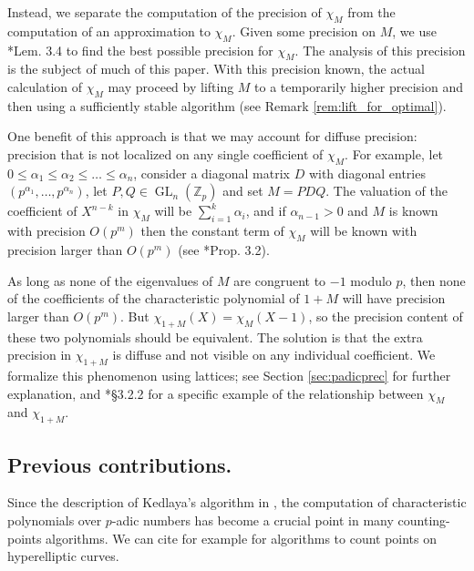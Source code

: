 \documentclass{sig-alternate-05-2015}
\DeclareMathOperator{\GL}{GL}
\newcommand{\Z}{\mathbb Z}
\newcommand{\Zp}{\Z_p}
\def\todo#1{\ \!\!{\color{red} #1}}
\begin{document}
Instead, we separate the computation of the precision of $\chi_M$ from the computation
of an approximation to $\chi_M$.  Given some precision on $M$, we use \cite{caruso-roe-vaccon:14a}*{Lem. 3.4}
to find the best possible precision for $\chi_M$.  The analysis of this precision is the subject
of much of this paper.  With this precision known, the actual calculation of $\chi_M$
may proceed by lifting $M$ to a temporarily higher precision and then using a sufficiently
stable algorithm (see Remark \ref{rem:lift_for_optimal}).

One benefit of this approach is that we may account for diffuse precision:
precision that is not localized on any single coefficient of $\chi_M$.  For example,
let $0 \le \alpha_1 \le \alpha_2 \le \dots \le \alpha_n$, consider a
diagonal matrix $D$ with diagonal entries $(p^{\alpha_1}, \dots, p^{\alpha_n})$,
let $P, Q \in \GL_n(\Zp)$ and set $M = PDQ$.  The valuation of the coefficient
of $X^{n-k}$ in $\chi_M$ will be $\sum_{i=1}^k \alpha_i$, and if $\alpha_{n-1} > 0$
and $M$ is known with precision $O(p^m)$ then the constant term of $\chi_M$
will be known with precision larger than $O(p^m)$ (see
\cite{caruso-roe-vaccon:15a}*{Prop. 3.2}).

As long as none of the eigenvalues of $M$ are congruent to $-1$ modulo $p$,
then none of the coefficients of the characteristic polynomial of $1+M$ will have
precision larger than $O(p^m)$.  But $\chi_{1+M}(X) = \chi_M(X-1)$, so the precision
content of these two polynomials should be equivalent. The solution is that the
extra precision in $\chi_{1+M}$ is diffuse and not visible on any individual coefficient.
We formalize this phenomenon using lattices; see Section \ref{sec:padicprec} for
further explanation, and \cite{caruso:17a}*{\S 3.2.2} for a specific example of the
relationship between $\chi_M$ and $\chi_{1+M}$.

\subsection*{Previous contributions.} 

Since the description of Kedlaya's algorithm in
\cite{kedlaya:01a}, the computation of characteristic polynomials
over $p$-adic numbers
has become a crucial point in many counting-points algorithms.
We can cite for example \cite{harvey:07a, harvey:14a} for
algorithms to count points on hyperelliptic curves.
\end{document}
